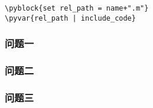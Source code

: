 \noindent
\textit{}
\begin{lstlisting}[frame=single]
\pyblock{set rel_path = name+".m"}
\pyvar{rel_path | include_code}
\end{lstlisting}

\subsubsection{问题一}
\subsubsection{问题二}
\subsubsection{问题三}
